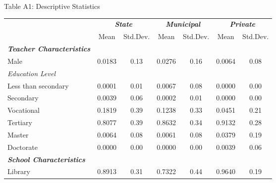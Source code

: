 \documentclass{beamer}
\begin{document}
\begin{frame}{Table A1: Descriptive Statistics}
\vspace{-3pt} 
\begin{adjustbox}{max width=\textwidth}
\vspace{-10pt} 
\begin{tabular}{l*{3}{cc}}
\toprule
                    &\multicolumn{2}{c}{\textbf{\emph{State}}}&\multicolumn{2}{c}{\textbf{\emph{Municipal}}}&\multicolumn{2}{c}{\textbf{\emph{Private}}}\\
                    &\multicolumn{1}{c}{{Mean}}&\multicolumn{1}{l}{{Std.Dev.}}&\multicolumn{1}{c}{{Mean}}&\multicolumn{1}{l}{{Std.Dev.}}&\multicolumn{1}{c}{{Mean}}&\multicolumn{1}{l}{{Std.Dev.}} \vspace{-5pt} \\
 \midrule
\textbf{\emph{Teacher Characteristics}}&            &            &            &            &            &           \vspace{-3pt} \\ 
Male                &      0.0183&        0.13&      0.0276&        0.16&      0.0064&        0.08\\
\emph{Education Level}&            &            &            &            &            &         \vspace{-3pt}   \\
Less than secondary &      0.0001&        0.01&      0.0067&        0.08&      0.0000&        0.00\\
Secondary           &      0.0039&        0.06&      0.0002&        0.01&      0.0000&        0.00\\
Vocational          &      0.1819&        0.39&      0.1238&        0.33&      0.0451&        0.21\\
Tertiary            &      0.8077&        0.39&      0.8632&        0.34&      0.9132&        0.28\\
Master              &      0.0064&        0.08&      0.0061&        0.08&      0.0379&        0.19\\
Doctorate           &      0.0000&        0.00&      0.0000&        0.00&      0.0039&        0.06\\
\textbf{\emph{School Characteristics}}&            &            &            &            &            &          \vspace{-3pt}  \\
Library             &      0.8913&        0.31&      0.7322&        0.44&      0.9640&        0.19\\

\end{tabular}
\end{adjustbox}
\end{frame}
\end{document}
